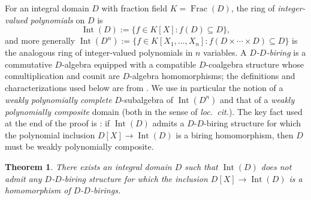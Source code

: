 \documentclass[11pt,reqno]{amsart}
\numberwithin{equation}{section}
\newtheorem{theorem}[thm]{Theorem}
\theoremstyle{definition}
\begin{document}
For an integral domain $D$ with fraction field $K=\operatorname{Frac}(D)$,
the ring of \emph{integer-valued polynomials} on $D$ is
\[
   \operatorname{Int}(D):=\{f\in K[X]:f(D)\subseteq D\},
\]
and more generally
$\operatorname{Int}(D^n):=\{f\in K[X_1,\dots,X_n]:f(D\times\cdots\times D)\subseteq D\}$
is the analogous ring of integer-valued polynomials in $n$ variables.
A \emph{$D$-$D$-biring} is a commutative $D$-algebra equipped with a
compatible $D$-coalgebra structure whose comultiplication and counit
are $D$-algebra homomorphisms; the definitions and characterizations
used below are from
\cite{Elliott2010-Plethories}. We use in
particular the notion of a \emph{weakly polynomially complete}
$D$-subalgebra of $\operatorname{Int}(D^n)$ and that of a \emph{weakly
polynomially composite} domain (both in the sense of \emph{loc.\
cit.}). The key fact used at the end of the proof is
\cite[Theorem~12(1)]{Elliott2010-Plethories}: if $\operatorname{Int}(D)$
admits a $D$-$D$-biring structure for which the polynomial inclusion
$D[X]\to\operatorname{Int}(D)$ is a biring homomorphism, then $D$ must
be weakly polynomially composite.

\begin{theorem}\label{thm:21}
There exists an integral domain $D$ such that $\operatorname{Int}(D)$
does not admit any $D$-$D$-biring structure for which the inclusion
$D[X]\to\operatorname{Int}(D)$ is a homomorphism of $D$-$D$-birings.
\end{theorem}
\end{document}
